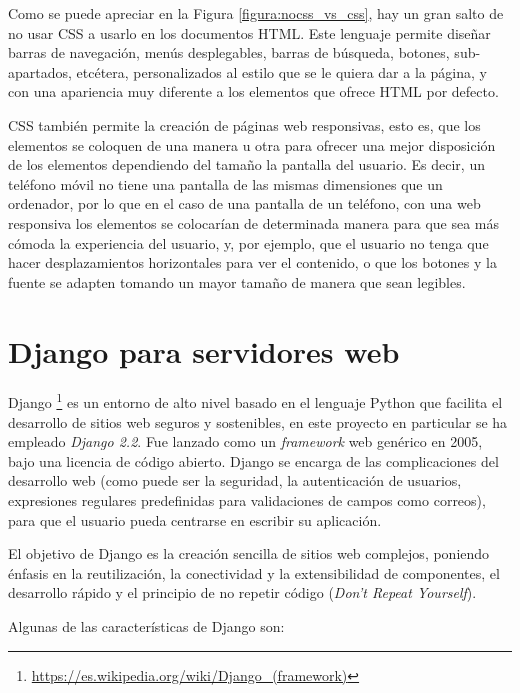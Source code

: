\documentclass[a4paper, 12pt]{book}
\begin{document}
Como se puede apreciar en la Figura \ref{figura:nocss_vs_css}, hay un gran salto de no usar CSS a usarlo en los documentos HTML. Este lenguaje permite diseñar barras de navegación, menús desplegables, barras de búsqueda, botones, sub-apartados, etcétera, personalizados al estilo que se le quiera dar a la página, y con una apariencia muy diferente a los elementos que ofrece HTML por defecto.

CSS también permite la creación de páginas web responsivas, esto es, que los elementos se coloquen de una manera u otra para ofrecer una mejor disposición de los elementos dependiendo del tamaño la pantalla del usuario. Es decir, un teléfono móvil no tiene una pantalla de las mismas dimensiones que un ordenador, por lo que en el caso de una pantalla de un teléfono, con una web responsiva los elementos se colocarían de determinada manera para que sea más cómoda la experiencia del usuario, y, por ejemplo, que el usuario no tenga que hacer desplazamientos horizontales para ver el contenido, o que los botones y la fuente se adapten tomando un mayor tamaño de manera que sean legibles.

\section{Django para servidores web}
\label{sec:django}

Django \footnote{\url{https://es.wikipedia.org/wiki/Django_(framework)}} \cite{django} es un entorno de alto nivel basado en el lenguaje Python que facilita el desarrollo de sitios web seguros y sostenibles, en este proyecto en particular se ha empleado \emph{Django 2.2}. Fue lanzado como un \emph{framework} web genérico en 2005, bajo una licencia de código abierto. Django se encarga de las complicaciones del desarrollo web (como puede ser la seguridad, la autenticación de usuarios, expresiones regulares predefinidas para validaciones de campos como correos), para que el usuario pueda centrarse en escribir su aplicación.

El objetivo de Django es la creación sencilla de sitios web complejos, poniendo énfasis en la reutilización, la conectividad y la extensibilidad de componentes, el desarrollo rápido y el principio de no repetir código (\textit{Don't Repeat Yourself}).

Algunas de las características de Django son:
\end{document}
